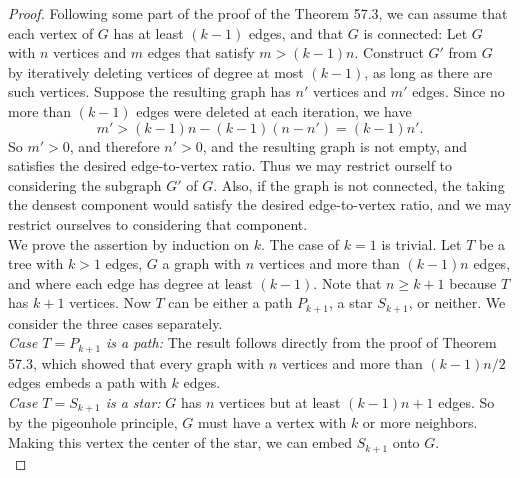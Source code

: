 \documentclass{article}
\begin{document}
\begin{enumerate}
\begin{enumerate}
        \begin{proof}
          Following some part of the proof of the Theorem 57.3, we can
          assume that each vertex of $G$ has at least $(k-1)$ edges, and
          that $G$ is connected: Let $G$ with $n$ vertices and $m$ edges
          that satisfy $m>(k-1)n$. Construct $G'$ from $G$ by iteratively
          deleting vertices of degree at most $(k-1)$, as long as there are
          such vertices. Suppose the resulting graph has $n'$ vertices and
          $m'$ edges. Since no more than $(k-1)$ edges were deleted at each
          iteration, we have
          \[m' >(k-1)n-(k-1)(n-n') =(k-1)n'.\]
          So $m'>0$, and therefore $n'>0$, and the resulting graph is not
          empty, and satisfies the desired edge-to-vertex ratio. Thus we
          may restrict ourself to considering the subgraph $G'$ of $G$.
          Also, if the graph is not connected, the taking the densest
          component would satisfy the desired edge-to-vertex ratio, and we
          may restrict ourselves to considering that component. \\

          We prove the assertion by induction on $k$. The case of $k=1$ is
          trivial. Let $T$ be a tree with $k>1$ edges, $G$ a graph with $n$
          vertices and more than $(k-1)n$ edges, and where each edge has
          degree at least $(k-1)$. Note that $n\geq k+1$ because $T$ has
          $k+1$ vertices. Now $T$ can be either a path $P_{k+1}$, a star
          $S_{k+1}$, or neither. We consider the three cases separately. \\

          \textit{Case $T=P_{k+1}$ is a path:} The result follows directly
          from the proof of Theorem 57.3, which showed that every graph
          with $n$ vertices and more than $(k-1)n/2$ edges embeds a path
          with $k$ edges. \\

          \textit{Case $T=S_{k+1}$ is a star:} $G$ has $n$ vertices but
          at least $(k-1)n+1$ edges. So by the pigeonhole principle, $G$
          must have a vertex with $k$ or more neighbors. Making this vertex
          the center of the star, we can embed $S_{k+1}$ onto $G$. \\


\end{proof}
\end{enumerate}
\end{enumerate}
\end{document}
